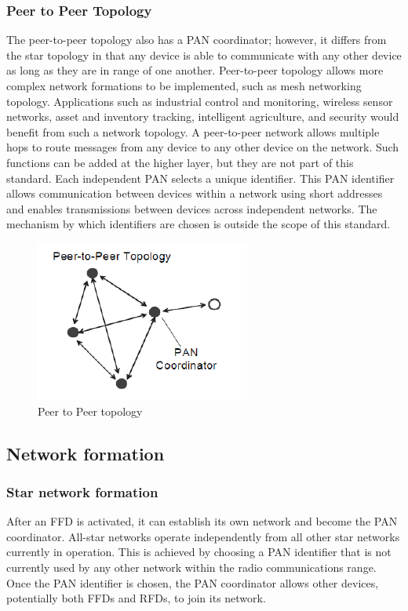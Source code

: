 \subsubsection{Peer to Peer Topology}
The peer-to-peer topology also has a PAN coordinator; however, it differs from the star topology in that any device is able to communicate with any other device as long as they are in range of one another. Peer-to-peer topology allows more complex network formations to be implemented, such as mesh networking topology. Applications such as industrial control and monitoring, wireless sensor networks, asset and inventory tracking, intelligent agriculture, and security would benefit from such a network topology. A peer-to-peer network allows multiple hops to route messages from any device to any other device on the network. Such functions can be added at the higher layer, but they are not part of this standard. Each independent PAN selects a unique identifier. This PAN identifier allows communication between devices within a network using short addresses and enables transmissions between devices across independent networks. The mechanism by which identifiers are chosen is outside the scope of this standard.
\begin{figure}[ht]
	\centering
	\includegraphics[scale=1]{images/peertopeertopology.png}
	\caption{Peer to Peer topology}
\end{figure}
\subsection{Network formation}
\subsubsection{Star network formation}
After an FFD is activated, it can establish its own network and become the PAN coordinator. All-star networks operate independently from all other star networks currently in operation. This is achieved by choosing a PAN identifier that is not currently used by any other network within the radio communications range. Once the PAN identifier is chosen, the PAN coordinator allows other devices, potentially both FFDs and RFDs, to join its network.

